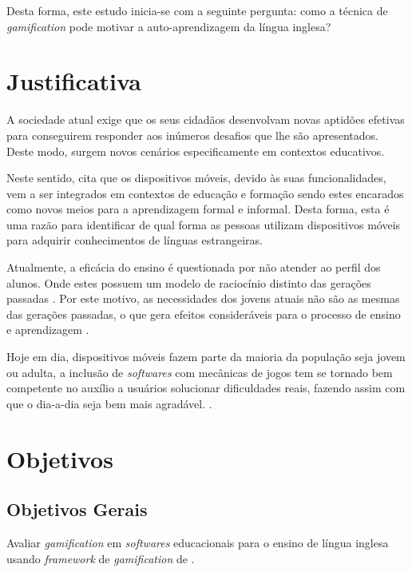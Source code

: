 \documentclass[
	12pt,				%
	openany,			%
	oneside,			%
	a4paper,			%
	english,			%
	french,				%
	spanish,			%
	brazil				%
	]{abntex2}
\begin{document}
Desta forma, este estudo inicia-se com a seguinte pergunta: como a técnica de \textit{gamification} pode motivar a auto-aprendizagem da língua inglesa?


\section{Justificativa}
A sociedade atual exige que os seus cidadãos desenvolvam novas aptidões efetivas para conseguirem responder aos inúmeros desafios que lhe são apresentados. Deste modo, surgem novos cenários especificamente em contextos educativos. 

Neste sentido,  cita que os dispositivos móveis, devido às suas funcionalidades, vem a ser integrados em contextos de educação e formação sendo estes encarados como novos meios para a aprendizagem formal e informal. Desta forma, esta é uma razão para identificar de qual forma as pessoas utilizam dispositivos móveis para adquirir conhecimentos de línguas estrangeiras.
	
Atualmente, a eficácia do ensino é questionada por não atender ao perfil dos alunos. Onde estes possuem um modelo de raciocínio distinto das gerações passadas \cite{PRENSKY2010}.  Por este motivo, as necessidades dos jovens atuais não são as mesmas das gerações passadas, o que gera efeitos consideráveis para o processo de ensino e aprendizagem \cite{PRENSKY2010}.
	
Hoje em dia, dispositivos móveis fazem parte da maioria da população seja jovem ou adulta, a inclusão de \textit{softwares} com mecânicas de jogos tem se tornado bem competente no auxílio a usuários solucionar dificuldades reais, fazendo assim com que o dia-a-dia seja bem mais agradável. \cite{LAW}.

\section{Objetivos}

\subsection{Objetivos Gerais}
Avaliar \textit{gamification} em \textit{softwares} educacionais para o ensino de língua inglesa usando \textit {framework} de \textit{gamification} de .
\end{document}
